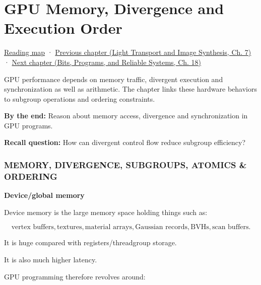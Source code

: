\chapter{GPU Memory, Divergence and Execution Order}\label{03-visual-computing-i-ch016-gpu-memory-divergence-and-execution-order}\hypertarget{03-visual-computing-i-ch016}{}\label{stagechapter:03-visual-computing-i-ch016}

\hypertarget{03-visual-computing-i-ch016-gpu-memory-divergence-and-execution-order}{}

\hyperref[volume-reading-map]{Reading map} · \href{../04-Light-Transport-and-Image-Synthesis/main.pdf\#nameddest=03-visual-computing-i-ch015-rasterization-foundations-and-renderer-evidence}{Previous chapter (Light Transport and Image Synthesis, Ch. 7)} · \href{../01-Bits-Programs-and-Reliable-Systems/main.pdf\#nameddest=03-visual-computing-i-ch017-build-test-and-reproduce-the-program}{Next chapter (Bits, Programs, and Reliable Systems, Ch. 18)}

GPU performance depends on memory traffic, divergent execution and synchronization as well as arithmetic. The chapter links these hardware behaviors to subgroup operations and ordering constraints.

\textbf{By the end:} Reason about memory access, divergence and synchronization in GPU programs.

\textbf{Recall question:} How can divergent control flow reduce subgroup efficiency?

\subsection{MEMORY, DIVERGENCE, SUBGROUPS, ATOMICS \& ORDERING}\label{03-visual-computing-i-ch016-memory-divergence-subgroups-atomics-ordering}

\hypertarget{03-visual-computing-i-ch016-memory-divergence-subgroups-atomics-ordering}{}

\textbf{Device/global memory}

Device memory is the large memory space holding things such as:

\[
\text{vertex buffers},
\text{textures},
\text{material arrays},
\text{Gaussian records},
\text{BVHs},
\text{scan buffers}.
\]

It is huge compared with registers/threadgroup storage.

It is also much higher latency.

GPU programming therefore revolves around:

